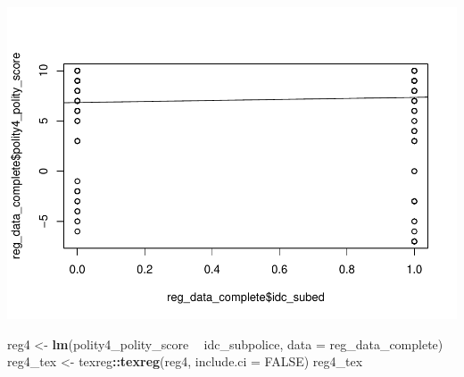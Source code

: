 \documentclass[
]{article}
\newenvironment{Shaded}{\begin{snugshade}}{\end{snugshade}}
\newcommand{\DataTypeTok}[1]{\textcolor[rgb]{0.13,0.29,0.53}{#1}}
\newcommand{\KeywordTok}[1]{\textcolor[rgb]{0.13,0.29,0.53}{\textbf{#1}}}
\newcommand{\NormalTok}[1]{#1}
\newcommand{\OperatorTok}[1]{\textcolor[rgb]{0.81,0.36,0.00}{\textbf{#1}}}
\newcommand{\OtherTok}[1]{\textcolor[rgb]{0.56,0.35,0.01}{#1}}
\newcommand{\StringTok}[1]{\textcolor[rgb]{0.31,0.60,0.02}{#1}}
\begin{document}
\begin{Shaded}
\end{Shaded}

\includegraphics{05_tjbrailey_summary_statistics_files/figure-latex/unnamed-chunk-4-3.pdf}

\begin{Shaded}
\begin{Highlighting}[]
\NormalTok{reg4 <-}\StringTok{ }\KeywordTok{lm}\NormalTok{(polity4_polity_score }\OperatorTok{~}\StringTok{ }\NormalTok{idc_subpolice, }\DataTypeTok{data =}\NormalTok{ reg_data_complete)}
\NormalTok{reg4_tex <-}\StringTok{ }\NormalTok{texreg}\OperatorTok{::}\KeywordTok{texreg}\NormalTok{(reg4, }\DataTypeTok{include.ci =} \OtherTok{FALSE}\NormalTok{)}
\NormalTok{reg4_tex}
\end{Highlighting}
\end{Shaded}
\end{document}
